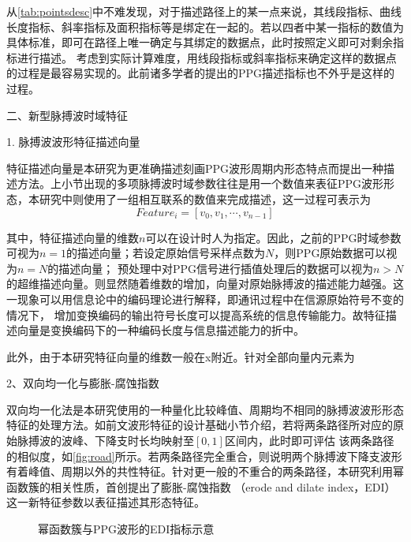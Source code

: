从\autoref{tab:pointsdesc}中不难发现，对于描述路径上的某一点来说，其线段指标、曲线长度指标、斜率指标及面积指标等是绑定在一起的。若以四者中某一指标的数值为具体标准，即可在路径上唯一确定与其绑定的数据点，此时按照定义即可对剩余指标进行描述。
考虑到实际计算难度，用线段指标或斜率指标来确定这样的数据点的过程是最容易实现的。此前诸多学者的提出的PPG描述指标也不外乎是这样的过程\cite{cwl,Wang2012,mmt}。

二、新型脉搏波时域特征

1. 脉搏波波形特征描述向量

特征描述向量是本研究为更准确描述刻画PPG波形周期内形态特点而提出一种描述方法。上小节出现的多项脉搏波时域参数往往是用一个数值来表征PPG波形形态，本研究中则使用了一组相互联系的数值来完成描述，这一过程可表示为
\begin{equation}
    \label{equ:featurevector}
    Feature_i=[v_0,v_1,\cdots,v_{n-1}]
\end{equation}

其中，特征描述向量的维数$n$可以在设计时人为指定。因此，之前的PPG时域参数可视为$n=1$的描述向量；若设定原始信号采样点数为$N$，则PPG原始数据可以视为$n=N$的描述向量；
预处理中对PPG信号进行插值处理后的数据可以视为$n>N$的超维描述向量。则显然随着维数的增加，向量对原始脉搏波的描述能力越强。这一现象可以用信息论中的编码理论进行解释，即通讯过程中在信源原始符号不变的情况下，
增加变换编码的输出符号长度可以提高系统的信息传输能力\cite{Zhao2017}。故特征描述向量是变换编码下的一种编码长度与信息描述能力的折中。

此外，由于本研究特征向量的维数一般在x附近。针对全部向量内元素为

2、双向均一化与膨胀-腐蚀指数

双向均一化法是本研究使用的一种量化比较峰值、周期均不相同的脉搏波波形形态特征的处理方法。如前文波形特征的设计基础小节介绍，若将两条路径所对应的原始脉搏波的波峰、下降支时长均映射至$[0,1]$区间内，此时即可评估
该两条路径的相似度，如\autoref{fig:road}所示。若两条路径完全重合，则说明两个脉搏波下降支波形有着峰值、周期以外的共性特征。针对更一般的不重合的两条路径，本研究利用幂函数簇的相关性质，首创提出了膨胀-腐蚀指数
（erode and dilate index，EDI）这一新特征参数以表征描述其形态特征。
\begin{figure}[h]
    \centering
    \quad
    \quad
    \quad
    \caption{\label{fig:powandedi}幂函数簇与PPG波形的EDI指标示意}
\end{figure}


